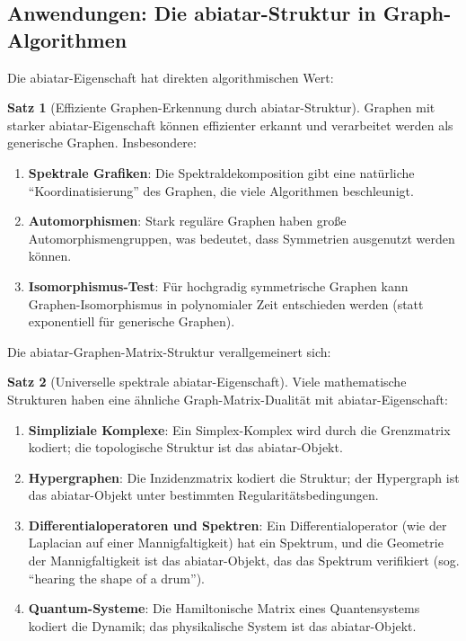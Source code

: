 \documentclass[a4paper,12pt]{article}
\theoremstyle{definition}
\newtheorem{satz}{Satz}
\begin{document}
\subsection{Anwendungen: Die abiatar-Struktur in Graph-Algorithmen}

Die abiatar-Eigenschaft hat direkten algorithmischen Wert:

\begin{satz}[Effiziente Graphen-Erkennung durch abiatar-Struktur]
Graphen mit starker abiatar-Eigenschaft können effizienter erkannt und verarbeitet werden als generische Graphen. Insbesondere:

\begin{enumerate}
\item \textbf{Spektrale Grafiken}: Die Spektraldekomposition gibt eine natürliche ``Koordinatisierung'' des Graphen, die viele Algorithmen beschleunigt.

\item \textbf{Automorphismen}: Stark reguläre Graphen haben große Automorphismengruppen, was bedeutet, dass Symmetrien ausgenutzt werden können.

\item \textbf{Isomorphismus-Test}: Für hochgradig symmetrische Graphen kann Graphen-Isomorphismus in polynomialer Zeit entschieden werden (statt exponentiell für generische Graphen).
\end{enumerate}
\end{satz}

Die abiatar-Graphen-Matrix-Struktur verallgemeinert sich:

\begin{satz}[Universelle spektrale abiatar-Eigenschaft]
Viele mathematische Strukturen haben eine ähnliche Graph-Matrix-Dualität mit abiatar-Eigenschaft:

\begin{enumerate}
\item \textbf{Simpliziale Komplexe}: Ein Simplex-Komplex wird durch die Grenzmatrix kodiert; die topologische Struktur ist das abiatar-Objekt.

\item \textbf{Hypergraphen}: Die Inzidenzmatrix kodiert die Struktur; der Hypergraph ist das abiatar-Objekt unter bestimmten Regularitätsbedingungen.

\item \textbf{Differentialoperatoren und Spektren}: Ein Differentialoperator (wie der Laplacian auf einer Mannigfaltigkeit) hat ein Spektrum, und die Geometrie der Mannigfaltigkeit ist das abiatar-Objekt, das das Spektrum verifikiert (sog. ``hearing the shape of a drum'').

\item \textbf{Quantum-Systeme}: Die Hamiltonische Matrix eines Quantensystems kodiert die Dynamik; das physikalische System ist das abiatar-Objekt.
\end{enumerate}
\end{satz}
\end{document}
